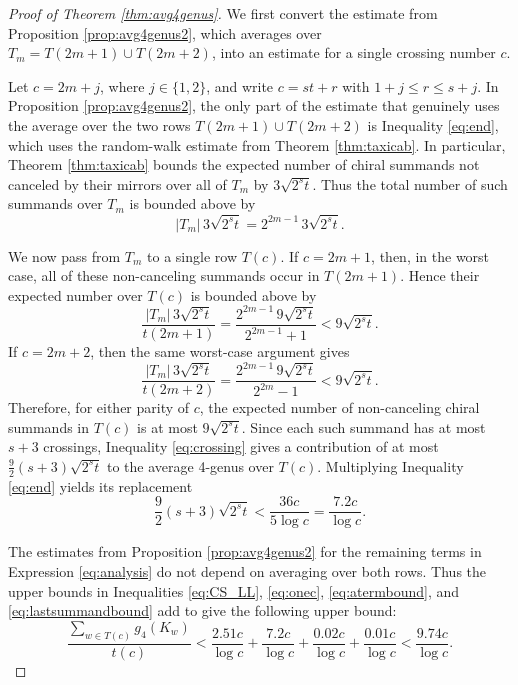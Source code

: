 \documentclass[12pt]{amsart}
\theoremstyle{definition}
\theoremstyle{remark}
\numberwithin{equation}{section}
\begin{document}
\begin{proof}[Proof of Theorem \ref{thm:avg4genus}]
We first convert the estimate from Proposition \ref{prop:avg4genus2}, which averages over $T_m=T(2m+1)\cup T(2m+2)$,
into an estimate for a single crossing number $c$.

Let $c=2m+j$, where $j\in\{1,2\}$, and write $c=st+r$ with $1+j\leq r\leq s+j$. In Proposition \ref{prop:avg4genus2}, the only part of the estimate that genuinely uses the average over the two rows $T(2m+1)\cup T(2m+2)$ is Inequality \eqref{eq:end}, which uses the random-walk estimate from Theorem \ref{thm:taxicab}. In particular, Theorem \ref{thm:taxicab} bounds the expected number of
chiral summands not canceled by their mirrors over all of $T_m$ by
$3\sqrt{2^s t}$. Thus the total number of such summands over $T_m$ is
bounded above by
\[
|T_m|\,3\sqrt{2^s t}=2^{2m-1}\,3\sqrt{2^s t}.
\]

We now pass from $T_m$ to a single row $T(c)$. If $c=2m+1$, then, in the
worst case, all of these non-canceling summands occur in $T(2m+1)$. Hence
their expected number over $T(c)$ is bounded above by
\[
\frac{|T_m|\,3\sqrt{2^s t}}{t(2m+1)}
=
\frac{2^{2m-1}\,9\sqrt{2^s t}}{2^{2m-1}+1}
<
9\sqrt{2^s t}.
\]
If $c=2m+2$, then the same worst-case argument gives
\[
\frac{|T_m|\,3\sqrt{2^s t}}{t(2m+2)}
=
\frac{2^{2m-1}\,9\sqrt{2^s t}}{2^{2m}-1}
<
9\sqrt{2^s t}.
\]
Therefore, for either parity of $c$, the expected number of non-canceling
chiral summands in $T(c)$ is at most $9\sqrt{2^s t}$. Since each such summand has at most $s+3$ crossings, Inequality
\eqref{eq:crossing} gives a contribution of at most $\frac{9}{2}(s+3)\sqrt{2^s t}$
to the average 4-genus over $T(c)$. Multiplying Inequality \eqref{eq:end} yields its replacement
\begin{equation}
\label{eq:onec}
\frac{9}{2}(s+3)\sqrt{2^s t} < \frac{36c}{5\log c} = \frac{7.2 c}{\log c}.
\end{equation}


The estimates from Proposition \ref{prop:avg4genus2} for the remaining
terms in Expression \eqref{eq:analysis} do not depend on averaging over both
rows. Thus the upper bounds in Inequalities \eqref{eq:CS_LL}, \eqref{eq:onec}, \eqref{eq:atermbound}, and \eqref{eq:lastsummandbound}   add to give the following upper bound:
\begin{equation}
\label{eq:staticterms}
\frac{\sum_{w\in T(c)} g_4(K_w)}{t(c)}
<
\frac{2.51c}{\log c}
+
\frac{7.2c}{\log c}
+
\frac{0.02c}{\log c}
+
\frac{0.01c}{\log c}
<
\frac{9.74c}{\log c}.
\end{equation}




\end{proof}
\end{document}
